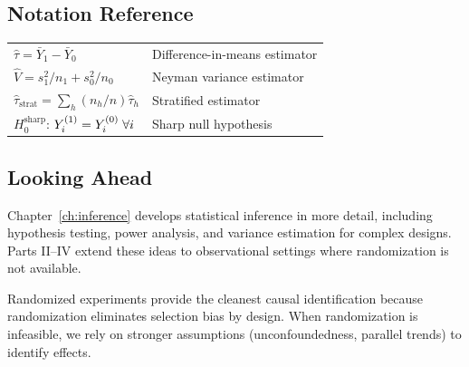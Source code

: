 \subsection{Notation Reference}

\begin{center}
\begin{tabular}{ll}
$\hat{\tau} = \bar{Y}_1 - \bar{Y}_0$ & Difference-in-means estimator \\
$\hat{V} = s_1^2/n_1 + s_0^2/n_0$ & Neyman variance estimator \\
$\hat{\tau}_{\text{strat}} = \sum_h (n_h/n) \hat{\tau}_h$ & Stratified estimator \\
$H_0^{\text{sharp}}$: $Y^{(1)}_i = Y^{(0)}_i \; \forall i$ & Sharp null hypothesis
\end{tabular}
\end{center}

\subsection{Looking Ahead}

Chapter~\ref{ch:inference} develops statistical inference in more detail, including hypothesis testing, power analysis, and variance estimation for complex designs. Parts II--IV extend these ideas to observational settings where randomization is not available.

\begin{insight}
Randomized experiments provide the cleanest causal identification because randomization eliminates selection bias by design. When randomization is infeasible, we rely on stronger assumptions (unconfoundedness, parallel trends) to identify effects.
\end{insight}
